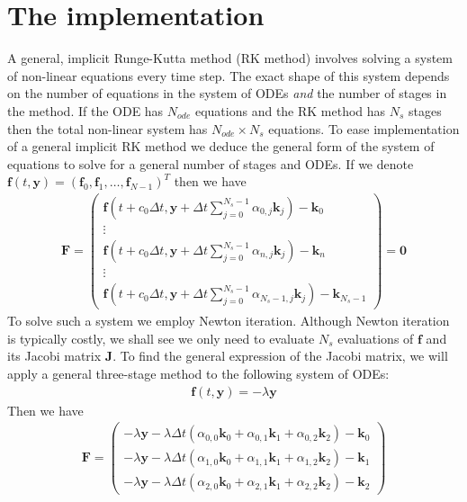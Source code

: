 \documentclass[10pt,a4paper]{article}
\newcommand{\bvec}[1]{\mathbf{#1}}
\begin{document}
\section{The implementation}
A general, implicit Runge-Kutta method (RK method) involves solving a system of non-linear equations every time step.
The exact shape of this system depends on the number of equations in the system of ODEs \emph{and} the number of stages in the method.
If the ODE has $N_{ode}$ equations and the RK method has $N_s$ stages then the total non-linear system has $N_{ode} \times N_s$ equations.
To ease implementation of a general implicit RK method we deduce the general form of the system of equations to solve for a general number of stages and ODEs.
If we denote $\bvec{f}(t,\bvec{y}) = (\bvec{f}_0, \bvec{f}_1, \hdots, \bvec{f}_{N-1})^T$ then we have
\begin{align*}
  \bvec{F} = 
  \begin{pmatrix}
    \bvec{f}\left( t + c_0\Delta t, \bvec{y} + \Delta t \sum_{j=0}^{N_s-1} \alpha_{0,j} \bvec{k}_j \right) - \bvec{k}_0 \\
    \vdots \\
    \bvec{f}\left( t + c_0\Delta t, \bvec{y} + \Delta t \sum_{j=0}^{N_s-1} \alpha_{n,j} \bvec{k}_j \right) - \bvec{k}_n \\
    \vdots \\
        \bvec{f}\left( t + c_0\Delta t, \bvec{y} + \Delta t \sum_{j=0}^{N_s-1} \alpha_{N_s-1,j} \bvec{k}_j \right) - \bvec{k}_{N_s-1}
      \end{pmatrix} =
  \bvec{0}
\end{align*}
To solve such a system we employ Newton iteration.
Although Newton iteration is typically costly, we shall see we only need to evaluate $N_{s}$ evaluations of $\bvec{f}$ and its Jacobi matrix $\bvec{J}.$
To find the general expression of the Jacobi matrix, we will apply a general three-stage method to the following system of ODEs:
\begin{align*}
  \bvec{f}(t, \bvec{y}) = -\lambda \bvec{y}
\end{align*}
Then we have
\begin{align*}
  \bvec{F} = \begin{pmatrix}
    -\lambda \bvec{y} - \lambda \Delta t \left( \alpha_{0,0}\bvec{k}_0 + \alpha_{0,1}\bvec{k}_1 + \alpha_{0,2}\bvec{k}_2  \right) - \bvec{k}_0 \\
    -\lambda \bvec{y} - \lambda \Delta t \left( \alpha_{1,0}\bvec{k}_0 + \alpha_{1,1}\bvec{k}_1 + \alpha_{1,2}\bvec{k}_2  \right) - \bvec{k}_1 \\
    -\lambda \bvec{y} - \lambda \Delta t \left( \alpha_{2,0}\bvec{k}_0 + \alpha_{2,1}\bvec{k}_1 + \alpha_{2,2}\bvec{k}_2  \right) - \bvec{k}_2
\end{pmatrix}\end{align*}
\end{document}
